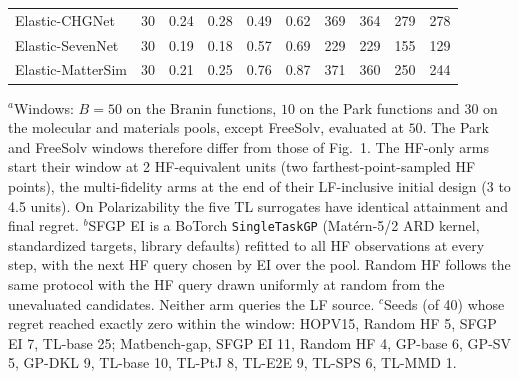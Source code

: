 \begin{table}[p]
\begin{tabular}{@{}lc cccc cccc@{}}
Elastic-CHGNet & 30 & 0.24 & 0.28 & 0.49 & 0.62 & 369 & 364 & 279 & 278 \\
Elastic-SevenNet & 30 & 0.19 & 0.18 & 0.57 & 0.69 & 229 & 229 & 155 & 129 \\
Elastic-MatterSim & 30 & 0.21 & 0.25 & 0.76 & 0.87 & 371 & 360 & 250 & 244 \\
\bottomrule
\end{tabular}
\par\smallskip
{\scriptsize
$^{a}$Windows: $B = 50$ on the Branin functions, $10$ on the Park functions and $30$ on the molecular and materials pools, except FreeSolv, evaluated at $50$. The Park and FreeSolv windows therefore differ from those of Fig.~1. The HF-only arms start their window at 2 HF-equivalent units (two farthest-point-sampled HF points), the multi-fidelity arms at the end of their LF-inclusive initial design (3 to 4.5 units). On Polarizability the five TL surrogates have identical attainment and final regret.
$^{b}$SFGP EI is a BoTorch \texttt{SingleTaskGP} (Mat\'{e}rn-5/2 ARD kernel, standardized targets, library defaults) refitted to all HF observations at every step, with the next HF query chosen by EI over the pool. Random HF follows the same protocol with the HF query drawn uniformly at random from the unevaluated candidates. Neither arm queries the LF source.
$^{c}$Seeds (of 40) whose regret reached exactly zero within the window: HOPV15, Random HF 5, SFGP EI 7, TL-base 25; Matbench-gap, SFGP EI 11, Random HF 4, GP-base 6, GP-SV 5, GP-DKL 9, TL-base 10, TL-PtJ 8, TL-E2E 9, TL-SPS 6, TL-MMD 1.
}
\end{table}

